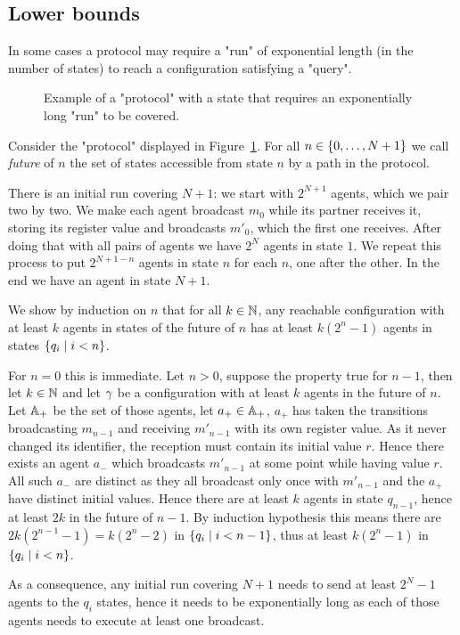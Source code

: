 \subsection{Lower bounds}
\label{sec:lower-bounds}

\begin{example}
	In some cases a protocol may require a "run" of exponential length (in the number of states) to reach a configuration satisfying a "query".
	
	\begin{figure}[h]
		
		\caption{Example of a "protocol" with a state that requires an exponentially long "run" to be covered.}
		\label{fig:exp-run}
	\end{figure}

	Consider the "protocol" displayed in Figure~\ref{fig:exp-run}. 
	For all $n \in \{0, \ldots, N+1\}$ we call \emph{future} of $n$ the set of states accessible from state $n$ by a path in the protocol.
	
	There is an initial run covering $N+1$: we start with $2^{N+1}$ agents, which we pair two by two. We make each agent broadcast $m_0$ while its partner receives it, storing its register value and broadcasts $m'_0$, which the first one receives. After doing that with all pairs of agents we have $2^{N}$ agents in state $1$.
	We repeat this process to put $2^{N+1-n}$ agents in state $n$ for each $n$, one after the other. In the end we have an agent in state $N+1$.
	
	We show by induction on $n$ that for all $k \in \mathbb{N}$, any reachable configuration with at least $k$ agents in states of the future of $n$ has at least $k(2^n-1)$ agents in states $\{q_i \mid i<n\}$.
	
	For $n=0$ this is immediate. Let $n>0$, suppose the property true for $n-1$, then let $k \in \mathbb{N}$ and let $\gamma$ be a configuration with at least $k$ agents in the future of $n$. Let $\mathbb{A}_+$ be the set of those agents, let $a_+ \in \mathbb{A}_+$, $a_+$ has taken the transitions broadcasting $m_{n-1}$ and receiving $m'_{n-1}$ with its own register value. As it never changed its identifier, the reception must contain its initial value $r$. Hence there exists an agent $a_-$ which broadcasts $m'_{n-1}$ at some point while having value $r$. All such $a_-$ are distinct as they all broadcast only once with $m'_{n-1}$ and the $a_+$ have distinct initial values.
	Hence there are at least $k$ agents in state $q_{n-1}$, hence at least $2k$ in the future of $n-1$. By induction hypothesis this means there are $2k(2^{n-1}-1) = k(2^n-2)$ in $\{q_i \mid i<n-1\}$, thus at least $k(2^n-1)$ in $\{q_i \mid i<n\}$.
	
	As a consequence, any initial run covering $N+1$ needs to send at least $2^N-1$ agents to the $q_i$ states, hence it needs to be exponentially long as each of those agents needs to execute at least one broadcast.
\end{example}

